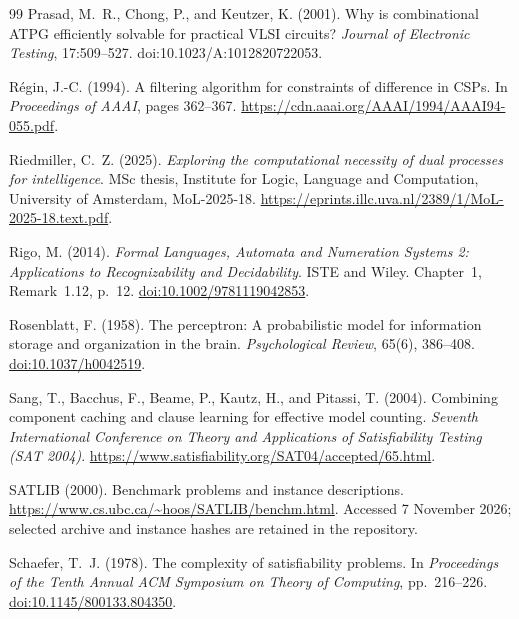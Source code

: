 \documentclass[11pt,a4paper]{article}
\numberwithin{equation}{section}
\theoremstyle{plain}
\theoremstyle{definition}
\theoremstyle{remark}
\begin{document}
\begin{thebibliography}{99}
Prasad, M.~R., Chong, P., and Keutzer, K. (2001).
Why is combinational ATPG efficiently solvable for practical VLSI circuits?
\emph{Journal of Electronic Testing}, 17:509--527.
doi:10.1023/A:1012820722053.

R\'egin, J.-C. (1994).
A filtering algorithm for constraints of difference in CSPs.
In \emph{Proceedings of AAAI}, pages 362--367.
\url{https://cdn.aaai.org/AAAI/1994/AAAI94-055.pdf}.

Riedmiller, C.~Z. (2025).
\emph{Exploring the computational necessity of dual processes for intelligence}.
MSc thesis, Institute for Logic, Language and Computation, University of Amsterdam, MoL-2025-18.
\url{https://eprints.illc.uva.nl/2389/1/MoL-2025-18.text.pdf}.

Rigo, M. (2014).
\emph{Formal Languages, Automata and Numeration Systems 2: Applications to Recognizability and Decidability}.
ISTE and Wiley. Chapter~1, Remark~1.12, p.~12.
\href{https://doi.org/10.1002/9781119042853}{doi:10.1002/9781119042853}.

Rosenblatt, F. (1958).
The perceptron: A probabilistic model for information storage and organization in the brain.
\emph{Psychological Review}, 65(6), 386--408.
\href{https://doi.org/10.1037/h0042519}{doi:10.1037/h0042519}.

Sang, T., Bacchus, F., Beame, P., Kautz, H., and Pitassi, T. (2004).
Combining component caching and clause learning for effective model counting.
\emph{Seventh International Conference on Theory and Applications of Satisfiability Testing (SAT 2004)}.
\url{https://www.satisfiability.org/SAT04/accepted/65.html}.

SATLIB (2000).
Benchmark problems and instance descriptions.
\url{https://www.cs.ubc.ca/~hoos/SATLIB/benchm.html}.
Accessed 7 November 2026; selected archive and instance hashes are retained in the repository.

Schaefer, T.~J. (1978).
The complexity of satisfiability problems.
In \emph{Proceedings of the Tenth Annual ACM Symposium on Theory of Computing}, pp.~216--226.
\href{https://doi.org/10.1145/800133.804350}{doi:10.1145/800133.804350}.


\end{thebibliography}
\end{document}
